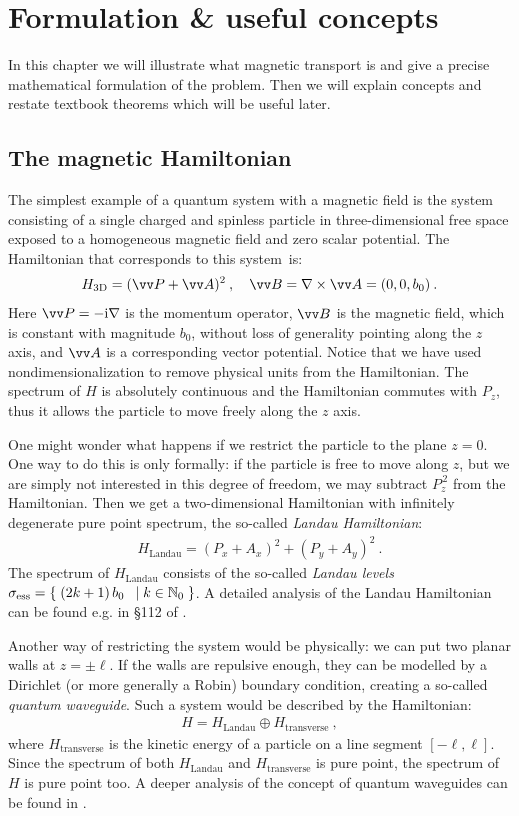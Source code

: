 \chapter{Formulation \& useful concepts} \label{chapter-formulation}
In this chapter we will illustrate what magnetic transport is and give a precise mathematical formulation of the problem. Then we will explain concepts and restate textbook theorems which will be useful later.

\section{The magnetic Hamiltonian}
The simplest example of a quantum system with a magnetic field is the system consisting of a single charged and spinless particle in three-dimensional free space exposed to a homogeneous magnetic field and zero scalar potential. The Hamiltonian that corresponds to this system~is:
\begin{align*}
    H_\mathrm{3D} = (\vv P + \vv A)^2 \: , \quad
    \vv B = \nabla \times \vv A = (0, 0, b_0) \: .
\end{align*}
Here $\vv P = -\i \nabla$ is the momentum operator, $\vv B$ is the magnetic field, which is constant with magnitude $b_0$, without loss of generality pointing along the $z$ axis, and $\vv A$ is a corresponding vector potential. Notice that we have used nondimensionalization to remove physical units from the Hamiltonian. The spectrum of $H$ is absolutely continuous and the Hamiltonian commutes with $P_z$, thus it allows the particle to move freely along the $z$ axis.

One might wonder what happens if we restrict the particle to the plane $z=0$. One way to do this is only formally: if the particle is free to move along $z$, but we are simply not interested in this degree of freedom, we may subtract $P_z^{\,2}$ from the Hamiltonian. Then we get a two-dimensional Hamiltonian with infinitely degenerate pure point spectrum, the so-called \textit{Landau Hamiltonian}:
\begin{align*}
    H_\mathrm{Landau} = (P_x + A_x)^2 + (P_y + A_y)^2 \: .
\end{align*}
The spectrum of $H_\mathrm{Landau}$ consists of the so-called \textit{Landau levels} $\sigma_{\mathrm{ess}} = \{ \; {(2k + 1) \, b_0} $ $\;|\; k \in \mathbb{N}_0 \; \}$. A detailed analysis of the Landau Hamiltonian can be found e.g. in §112 of \cite{LandauLifshitz3}.

Another way of restricting the system would be physically: we can put two planar walls at $z=\pm\ell$. If the walls are repulsive enough, they can be modelled by a Dirichlet (or more generally a Robin) boundary condition, creating a so-called \textit{quantum waveguide}. Such a system would be described by the Hamiltonian:
\begin{align*}
    H = H_\mathrm{Landau} \oplus H_\mathrm{transverse} \: ,
\end{align*}
where $H_\mathrm{transverse}$ is the kinetic energy of a particle on a line segment $[ -\ell, \ell ]$. Since the spectrum of both $H_\mathrm{Landau}$ and $H_\mathrm{transverse}$ is pure point, the spectrum of $H$ is pure point too. A deeper analysis of the concept of quantum waveguides can be found in \cite{ExnerKovarik2015}.

